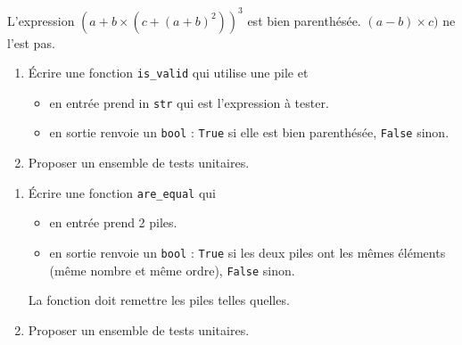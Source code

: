 \documentclass[10pt,cours,firamath,a4paper]{nsi}
\begin{document}
\begin{exercice}
L'expression $(a+b\times(c+(a+b)^2))^3$ est bien parenthésée. $(a-b)\times c)$ ne l'est pas.
\begin{enumerate}
	\item 	\'Ecrire une fonction \texttt{is_valid} qui utilise une pile et
	\begin{itemize}
		\item 	en entrée prend in \texttt{str} qui est l'expression à tester.
		\item 	en sortie renvoie un \texttt{bool} : \texttt{True} si elle est bien parenthésée, \texttt{False} sinon.
	\end{itemize}
	\item 	Proposer un ensemble de tests unitaires.	
\end{enumerate}
\end{exercice}

\begin{exercice}
	\begin{enumerate}
		\item 	\'Ecrire une fonction \texttt{are_equal} qui
		\begin{itemize}
			\item 	en entrée prend 2 piles.
			\item 	en sortie renvoie un \texttt{bool} : \texttt{True} si les deux piles ont les mêmes éléments (même nombre et même ordre), \texttt{False} sinon.
		\end{itemize}
		La fonction doit remettre les piles telles quelles.
	\item 	Proposer un ensemble de tests unitaires.	
	\end{enumerate}

\end{exercice}
\end{document}
